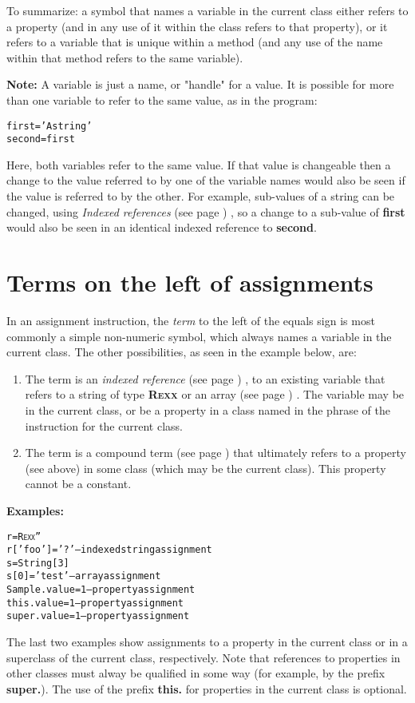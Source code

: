 To summarize: a symbol that names a variable in the current class either
refers to a property (and in any use of it within the class refers to
that property), or it refers to a variable that is unique within a
method (and any use of the name within that method refers to the same
variable).
\begin{shaded}\noindent
\textbf{Note: }
A variable is just a name, or "handle" for a value.
It is possible for more than one variable to refer to the same value, as
in the program:
\begin{alltt}
first='A string'
second=first
\end{alltt}
Here, both variables refer to the same value.  If that value is
changeable then a change to the value referred to by one of the
variable names would also be seen if the value is referred to by the
other.
For example, sub-values of a \nr{} string can be changed, using
 \emph{Indexed references} (see page \pageref{refinstr}) , so a change to a
sub-value of \textbf{first} would also be seen in an identical indexed
reference to \textbf{second}.
\end{shaded}\indent
\section{Terms on the left of assignments}
 
In an assignment instruction, the \emph{term} to the left of the
equals sign is most commonly a simple non-numeric symbol, which
always names a variable in the current class.
The other possibilities, as seen in the example below, are:
\begin{enumerate}
\item 
The term is an  \emph{indexed reference} (see page \pageref{refinstr}) , to an
existing variable that refers to a string of type \textbf{R\textsc{exx}} or an
 array (see page \pageref{refarray}) .
The variable may be in the current class, or be a property in a class
named in the  phrase of the  instruction for
the current class.
\item 
The term is a  compound term (see page \pageref{refcomterm})  that ultimately refers
to a property (see above) in some class (which may be the current class).
This property cannot be a constant.
\end{enumerate}
 \textbf{Examples:}
\begin{alltt}
r=R\textsc{exx} ''
r['foo']='?'         -- indexed string assignment
s=String[3]
s[0]='test'          -- array assignment
Sample.value=1       -- property assignment
this.value=1         -- property assignment
super.value=1        -- property assignment
\end{alltt}

The last two examples show assignments to a property in the current
class or in a superclass of the current class, respectively.  Note that
references to properties in other classes must alway be qualified in
some way (for example, by the prefix \textbf{super.}).  The use of the
prefix \textbf{this.} for properties in the current class is optional.

